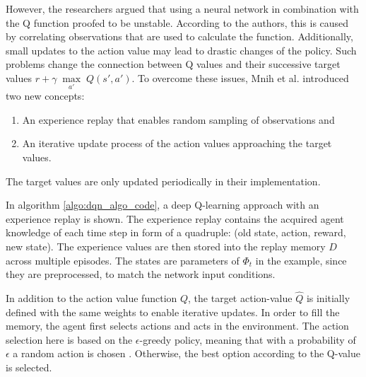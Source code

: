 However, the researchers argued that using a neural network in combination with the Q function proofed to be unstable. According to the authors, this is caused by correlating observations that are used to calculate the function. Additionally, small updates to the action value may lead to drastic changes of the policy. Such problems change the connection between Q values and their successive target values $r+\gamma \; \underset{a'} \max \; Q(s',a')$. To overcome these issues, Mnih et al. introduced two new concepts: 
\begin{enumerate}
  \item An experience replay that enables random sampling of observations and
  \item An iterative update process of the action values approaching the target values.
\end{enumerate}
The target values are only updated periodically in their implementation.

In algorithm \ref{algo:dqn_algo_code}, a deep Q-learning approach with an experience replay is shown. The experience replay contains the acquired agent knowledge of each time step in form of a quadruple: (old state, action, reward, new state). The experience values are then stored into the replay memory $D$ across multiple episodes. The states are parameters of $\Phi_{t}$ in the example, since they are preprocessed, to match the network input conditions.

In addition to the action value function $Q$, the target action-value $\hat Q$ is initially defined with the same weights to enable iterative updates. In order to fill the memory, the agent first selects actions and acts in the environment. The action selection here is based on the $\epsilon$-greedy policy, meaning that with a probability of $\epsilon$ a random action is chosen \cite{mnka15}. Otherwise, the best option according to the Q-value is selected.

